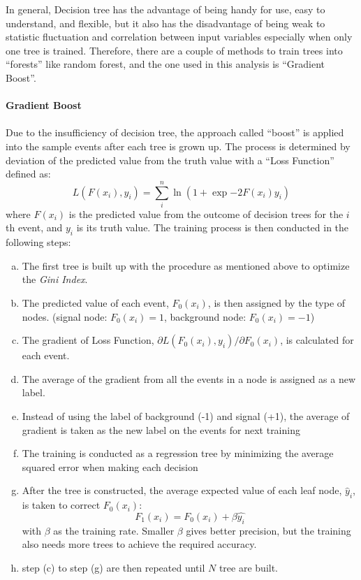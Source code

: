 In general, Decision tree has the advantage of being handy for use, easy to understand, and flexible, but it also has the disadvantage of being weak to statistic fluctuation and correlation between input variables especially when only one tree is trained. Therefore, there are a couple of methods to train trees into ``forests'' like random forest, and the one used in this analysis is ``Gradient Boost''.
\\
\\{\bf Gradient Boost}
\\
\\Due to the insufficiency of decision tree, the approach called ``boost'' is applied into the sample events after each tree is grown up. The process is determined by deviation of the predicted value from the truth value with a ``Loss Function'' defined as:
\begin{equation}
L(F(x_{i}), y_{i}) = \sum_{i}^{n}\ln(1+\exp{-2F(x_i)y_{i}})
\end{equation} 
where $F(x_{i})$ is the predicted value from the outcome of decision trees for the $i$th event, and $y_{i}$ is its truth value. The training process is then conducted in the following steps:
\begin{enumerate}[(a)]
	\item  The first tree is built up with the procedure as mentioned above to optimize the \textit{Gini Index}.
	\item  The predicted value of each event, $F_{0}(x_i)$, is then assigned by the type of nodes. (signal node: $F_{0}(x_i)=1$, background node: $F_{0}(x_i)=-1$)
	\item  The gradient of Loss Function, $\partial L(F_{0}(x_{i}), y_{i}) / \partial F_{0}(x_i)$, is calculated for each event.
	\item  The average of the gradient from all the events in a node is assigned as a new label.
	\item  Instead of using the label of background (-1) and signal (+1), the average of gradient is taken as the new label on the events for next training
	\item  The training is conducted as a regression tree by minimizing the average squared error when making each decision
	\item  After the tree is constructed, the average expected value of each leaf node, $\hat{y}_{i}$, is taken to correct $F_{0}(x_i)$:
	\begin{equation}
	F_{1}(x_i) = F_{0}(x_i)+\beta \hat{y_i}
	\end{equation}
	with $\beta$ as the training rate. Smaller $\beta$ gives better precision, but the training also needs more trees to achieve the required accuracy. 
	\item step (c) to step (g)  are then repeated until $N$ tree are built.
\end{enumerate}
